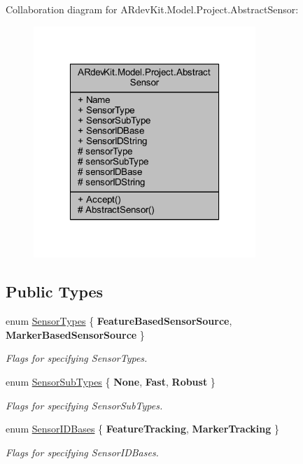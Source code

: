 Collaboration diagram for A\-Rdev\-Kit.\-Model.\-Project.\-Abstract\-Sensor\-:
\nopagebreak
\begin{figure}[H]
\begin{center}
\leavevmode
\includegraphics[width=238pt]{class_a_rdev_kit_1_1_model_1_1_project_1_1_abstract_sensor__coll__graph}
\end{center}
\end{figure}
\subsection*{Public Types}
\begin{DoxyCompactItemize}
\item 
enum \hyperlink{class_a_rdev_kit_1_1_model_1_1_project_1_1_abstract_sensor_a1954adedcf2a2f61256c9b11fe0c8386}{Sensor\-Types} \{ {\bfseries Feature\-Based\-Sensor\-Source}, 
{\bfseries Marker\-Based\-Sensor\-Source}
 \}
\begin{DoxyCompactList}\small\item\em Flags for specifying Sensor\-Types. \end{DoxyCompactList}\item 
enum \hyperlink{class_a_rdev_kit_1_1_model_1_1_project_1_1_abstract_sensor_af7b41fc81d926ed779ca02ef894fcddf}{Sensor\-Sub\-Types} \{ {\bfseries None}, 
{\bfseries Fast}, 
{\bfseries Robust}
 \}
\begin{DoxyCompactList}\small\item\em Flags for specifying Sensor\-Sub\-Types. \end{DoxyCompactList}\item 
enum \hyperlink{class_a_rdev_kit_1_1_model_1_1_project_1_1_abstract_sensor_a8eecc60106e6a54a3e096c63a7d4d012}{Sensor\-I\-D\-Bases} \{ {\bfseries Feature\-Tracking}, 
{\bfseries Marker\-Tracking}
 \}
\begin{DoxyCompactList}\small\item\em Flags for specifying Sensor\-I\-D\-Bases. \end{DoxyCompactList}\end{DoxyCompactItemize}
